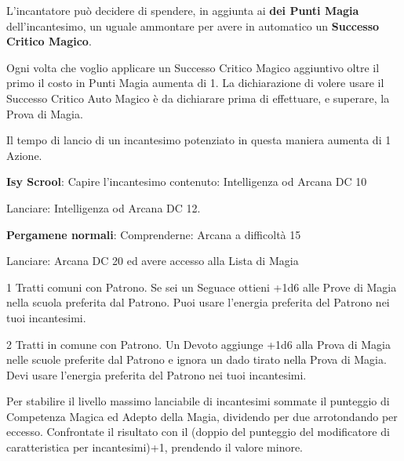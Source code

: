 \documentclass[landscape,10pt,a4paper]{article}
\begin{document}
\begin{multicols}{2}
\begin{dmbox}[title=Successo Critico Auto Magico - pagina \pageref{magienova}]
L'incantatore può decidere di spendere, in aggiunta ai \textbf{dei Punti Magia} dell'incantesimo, un uguale ammontare per avere in automatico un \textbf{Successo Critico Magico}.

Ogni volta che voglio applicare un Successo Critico Magico aggiuntivo oltre il primo il costo in Punti Magia aumenta di 1. La dichiarazione di volere usare il Successo Critico Auto Magico è da dichiarare prima di effettuare, e superare, la Prova di Magia.

Il tempo di lancio di un incantesimo potenziato in questa maniera aumenta di 1 Azione.
\end{dmbox}


\begin{dmbox}[title=Leggere una Pergamena - pagina \pageref{leggerepergamena}]

\textbf{Isy Scrool}: Capire l'incantesimo contenuto: Intelligenza od Arcana DC 10

Lanciare: Intelligenza od Arcana DC 12.

\textbf{Pergamene normali}: Comprenderne: Arcana a difficoltà 15

Lanciare: Arcana DC 20 ed avere accesso alla Lista di Magia
\end{dmbox}


\begin{dmbox}[title=Seguace - pagina \pageref{magieregoledibase}]
1 Tratti comuni con Patrono. Se sei un Seguace ottieni +1d6 alle Prove di Magia nella scuola preferita dal Patrono. Puoi usare l'energia preferita del Patrono nei tuoi incantesimi.
\end{dmbox}

\begin{dmbox}[title=Devoto - pagina \pageref{magieregoledibase}]
2 Tratti in comune con Patrono. Un Devoto aggiunge +1d6 alla Prova di Magia nelle scuole preferite dal Patrono e ignora un dado tirato nella Prova di Magia. Devi usare l'energia preferita del Patrono nei tuoi incantesimi.
\end{dmbox}


\begin{dmbox}[title=Massimo Livello Incantesimo lanciabile - pagina \pageref{magieaccessoallelistedimagia}]
Per stabilire il livello massimo lanciabile di incantesimi sommate il punteggio di Competenza Magica ed Adepto della Magia, dividendo per due arrotondando per eccesso. Confrontate il risultato con il (doppio del punteggio del modificatore di caratteristica per incantesimi)+1, prendendo il valore minore.
\end{dmbox}


\end{multicols}
\end{document}
